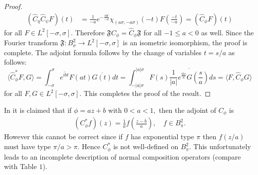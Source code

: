 \documentclass[11pt]{amsart}%
\numberwithin{equation}{section}
\theoremstyle{plain}
\theoremstyle{definition}
\theoremstyle{definition}
\begin{document}
\begin{proof}
\begin{align*}
(\widehat{C}_{\eta}\widehat{C}_{\psi}F)(t)&=\frac{1}{-a}e^{-\frac{ibt}{-a}}\chi_{(a\sigma, -a\sigma)}(-t)F\left(\frac{-t}{-a}\right)
=(\widehat{C}_{\phi}F)(t)
\end{align*}
for all $F\in L^2[-\sigma,\sigma]$. Therefore $\mathfrak{F}C_{\phi}= \widehat{C}_{\phi}\mathfrak{F}$ for all $-1\leq a<0$ as well. Since the Fourier transform $\mathfrak{F}:B^2_\sigma\to L^2[-\sigma,\sigma]$ is an isometric isomorphism, the proof is complete. The adjoint 
formula follows by the change of variables $t=s/a$ as follows:
\[
\langle \widehat{C}_{\phi}^*F, G\rangle=\int^\sigma_{-\sigma}\overline{e^{ibt}}F(at)\overline{G(t)}dt=\int^{|a|\sigma}_{-|a|\sigma}F(s)\overline{\frac{1}{|a|}e^{\frac{\mathrm{i}bs}{a}}G\left(\frac{s}{a}\right)}ds=\langle F, \widehat{C}_{\phi}G\rangle
\]
for all $F,G\in L^2[-\sigma,\sigma]$. This completes the proof of the result.
\end{proof}
In \cite[p. 2209]{chacon2007composition} it is claimed that if $\phi=az+b$ with $0<a<1,$ then the adjoint of $C_\phi$ is 
\begin{align*}
(C_{\phi}^*f)(z)=\frac{1}{a}f\left(\frac{z-\overline{b}}{a}\right), \quad f\in B^2_{\pi}.
\end{align*}
However this cannot be correct since if $f$ has exponential type $\pi$ then $f(z/a)$ must have type $\pi/a>\pi$. Hence $C_\phi^*$ is not well-defined on $B^2_{\pi}$. This unfortunately leads to an incomplete description of normal composition operators (compare \cite[Prop. 2.6]{chacon2007composition} with Table $1$).

  

\end{document}
